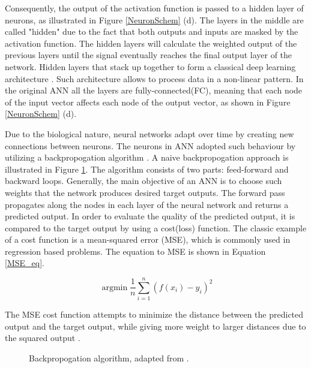 \documentclass[english, 12pt, a4paper, elec, utf8, a-1b, online]{aaltothesis}
\begin{document}
Consequently, the output of the activation function is passed to a hidden layer of neurons, as illustrated in Figure \ref{NeuronSchem} (d). The layers in the middle are called "hidden" due to the fact that both outputs and inputs are masked by the activation function.  The hidden layers will calculate the weighted output of the previous layers until the signal eventually reaches the final output layer of the network. Hidden layers that stack up together to form a classical deep learning architecture \cite{OShea2015}. Such architecture allows to process data in a non-linear pattern. In the original ANN all the layers are fully-connected(FC), meaning that each node of the input vector affects each node of the output vector, as shown in Figure \ref{NeuronSchem} (d).


Due to the biological nature, neural networks adapt over time by creating new connections between neurons. The neurons in ANN adopted such behaviour by utilizing a backpropogation algorithm \cite{Rumelhart:1986we}. A naive backpropogation approach is illustrated in Figure \ref{fig:backprop}. The algorithm consists of two parts: feed-forward and backward loops. Generally, the main objective of an ANN is to choose such weights that the network produces desired target outputs. The forward pass propagates along the nodes in each layer of the neural network and returns a predicted output. In order to evaluate the quality of the predicted output, it is compared to the target output by using a cost(loss) function. The classic example of a cost function is a mean-squared error (MSE), which is commonly used in regression based problems. The equation to MSE is shown in Equation \ref{MSE_eq}.

\begin{equation}\label{MSE_eq} 
{\operatorname{argmin}} \frac{1}{n} \sum_{i=1}^{n}\left(f\left(x_{i}\right)-y_{i}\right)^{2}
\end{equation}

The MSE cost function attempts to minimize the distance between the predicted output and the target output, while giving more weight to larger distances due to the squared output \cite{Albarghouthi2021}.


\begin{figure}[htb]
    \centering
    \qquad
    \caption{Backpropogation algorithm, adapted from \cite{Alber2018}.}\label{fig:backprop}%
\end{figure}
\FloatBarrier
\end{document}
